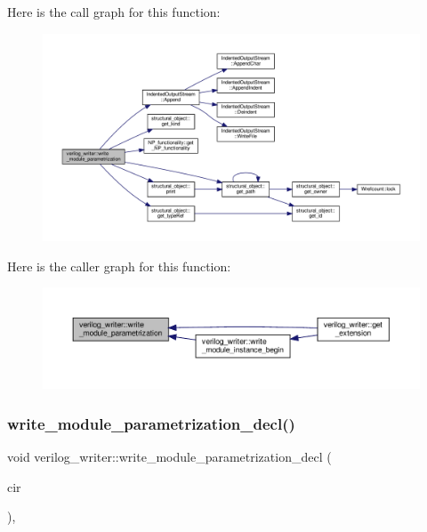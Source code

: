 Here is the call graph for this function\+:
\nopagebreak
\begin{figure}[H]
\begin{center}
\leavevmode
\includegraphics[width=350pt]{d8/dba/classverilog__writer_aa097c810dcf1d52f5559ad89def6da17_cgraph}
\end{center}
\end{figure}
Here is the caller graph for this function\+:
\nopagebreak
\begin{figure}[H]
\begin{center}
\leavevmode
\includegraphics[width=350pt]{d8/dba/classverilog__writer_aa097c810dcf1d52f5559ad89def6da17_icgraph}
\end{center}
\end{figure}
\mbox{\label{classverilog__writer_a429d09829b565c8bb4b243b0eb089546}} 
\subsubsection{\texorpdfstring{write\+\_\+module\+\_\+parametrization\+\_\+decl()}{write\_module\_parametrization\_decl()}}
{\footnotesize\ttfamily void verilog\+\_\+writer\+::write\+\_\+module\+\_\+parametrization\+\_\+decl (\begin{DoxyParamCaption}\item[{const \hyperlink{structural__objects_8hpp_a8ea5f8cc50ab8f4c31e2751074ff60b2}{structural\+\_\+object\+Ref} \&}]{cir }\end{DoxyParamCaption})\hspace{0.3cm}{\ttfamily [override]}, {\ttfamily [virtual]}}



